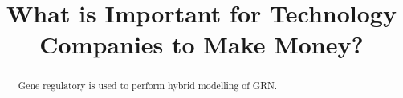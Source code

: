 \documentclass[twocolumn]{bmcart}%
\begin{document}
\begin{frontmatter}

\begin{fmbox}


\title{What is Important for Technology Companies to Make Money?}


\author[
   email={sh3g12@soton.ac.uk}   %
]{ }



\begin{abstractbox}

\begin{abstract} %
Gene regulatory \cite{winterman-kelly-online-shopper} is used to perform hybrid modelling of GRN.
\end{abstract}

\end{abstractbox}
%
\end{fmbox}%

\end{frontmatter}
\end{document}
